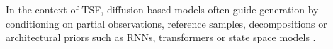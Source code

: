 \documentclass[a4paper,oneside,bibliography=totoc]{scrbook}
\begin{document}
In the context of TSF, diffusion-based models often guide generation by conditioning
on partial observations, reference samples, decompositions or architectural priors such as RNNs, transformers or state space models \cite{rasul_autoregressive_2021, tashiro_csdi_2021, alcaraz_diffusion-based_2022, shen_non-autoregressive_2023, liu_retrieval-augmented_2024, shen_multi-resolution_2023}.
\end{document}
